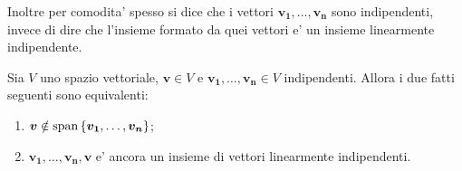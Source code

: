 Inoltre per comodita' spesso si dice che i vettori $\bm{v_1}, \dots, \bm{v_n}$ sono indipendenti, invece di dire che l'insieme formato da quei vettori e' un insieme linearmente indipendente.

\begin{proposition}\label{aggiunto_vettore_indipendente}
    Sia $V$ uno spazio vettoriale, $\bm v \in V$ e $\bm{v_1}, \dots, \bm{v_n} \in V$ indipendenti. Allora i due fatti seguenti sono equivalenti:
    \begin{enumerate}
        \item $\bm v \notin \operatorname{span}\left\{\bm{v_1}, \dots, \bm{v_n}\right\}$;
        \item $\bm{v_1}, \dots, \bm{v_n}, \bm v$ e' ancora un insieme di vettori linearmente indipendenti.
    \end{enumerate}
\end{proposition}
